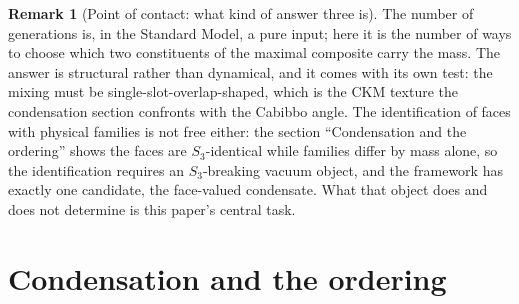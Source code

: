 \documentclass[11pt]{article}
\theoremstyle{definition}
\newtheorem{remark}[theorem]{Remark}
\theoremstyle{plain}
\begin{document}
\begin{remark}[Point of contact: what kind of answer three is]\label{c:note.families.point-contact-what-kind-answer-three}
The number of generations is, in the Standard Model, a pure input; here it is the number of ways to choose which two constituents of the maximal composite carry the mass. The answer is structural rather than dynamical, and it comes with its own test: the mixing must be single-slot-overlap-shaped, which is the CKM texture the condensation section confronts with the Cabibbo angle. The identification of faces with physical families is not free either: the section ``Condensation and the ordering'' shows the faces are $S_{3}$-identical while families differ by mass alone, so the identification requires an $S_{3}$-breaking vacuum object, and the framework has exactly one candidate, the face-valued condensate. What that object does and does not determine is this paper's central task.
\end{remark}

\section{Condensation and the ordering}
\end{document}
